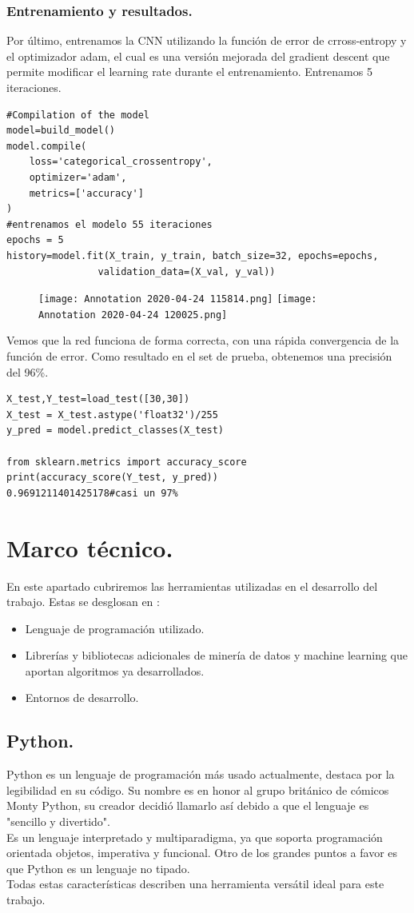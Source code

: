 \documentclass[a4paper,10pt]{article}
\begin{document}
\subsubsection{Entrenamiento y resultados.}
Por último, entrenamos la CNN utilizando  la función de error de crross-entropy y el optimizador adam, el cual es una versión mejorada del gradient descent que permite modificar el learning rate durante el entrenamiento. Entrenamos 5 iteraciones.
\begin{lstlisting}
#Compilation of the model
model=build_model()
model.compile(
    loss='categorical_crossentropy', 
    optimizer='adam', 
    metrics=['accuracy']
)
#entrenamos el modelo 55 iteraciones
epochs = 5
history=model.fit(X_train, y_train, batch_size=32, epochs=epochs,
				validation_data=(X_val, y_val))
\end{lstlisting}
\begin{figure}[H]
\centering
\texttt{[image: Annotation 2020-04-24 115814.png]}\hfill
\texttt{[image: Annotation 2020-04-24 120025.png]}
\end{figure}

\noindent
Vemos que la red funciona de forma correcta, con una rápida convergencia de la función de error. Como resultado en el set de prueba, obtenemos una precisión del 96\%.

\begin{lstlisting}
X_test,Y_test=load_test([30,30])
X_test = X_test.astype('float32')/255 
y_pred = model.predict_classes(X_test)

from sklearn.metrics import accuracy_score
print(accuracy_score(Y_test, y_pred))
0.9691211401425178#casi un 97%
\end{lstlisting}


\section{Marco técnico.}
En este apartado cubriremos las herramientas utilizadas en el desarrollo del trabajo. Estas se desglosan en :
\begin{itemize}
\item Lenguaje de programación utilizado.
\item Librerías y bibliotecas adicionales de minería de datos y machine learning que aportan algoritmos ya desarrollados.
\item Entornos  de desarrollo.
\end{itemize}
\subsection{Python.}
Python es un lenguaje de programación	más usado actualmente, destaca por la legibilidad en su código. Su nombre es en honor al grupo británico de cómicos Monty Python, su creador decidió llamarlo así debido a que el lenguaje es "sencillo y divertido".\\
Es un lenguaje interpretado y  multiparadigma, ya que soporta programación orientada objetos, imperativa y funcional. Otro de los grandes puntos a favor es que Python es un lenguaje no tipado.\\
Todas estas características describen una herramienta versátil ideal para este trabajo. 
\end{document}
